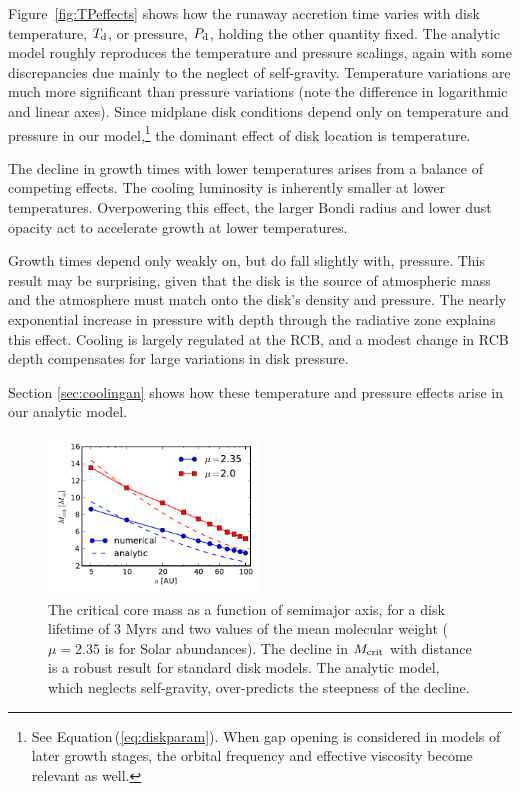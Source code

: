 \documentclass[apj, numberedappendix]{emulateapj}
\newcommand{\Eq}[1]{Equation\,(\ref{#1})}
\newcommand{\Fig}[1]{Figure~\ref{#1}}
\newcommand{\di}{_{\rm d}}
\newcommand{\MC}{M_{\rm crit}}
\begin{document}
\Fig{fig:TPeffects} shows how the runaway accretion time varies with disk temperature, $T\di$, or pressure, $P\di$, holding the other quantity fixed.   The analytic model roughly reproduces the temperature and pressure scalings, again with some discrepancies due mainly to the neglect of self-gravity.  Temperature variations are much more significant than pressure variations (note the difference in logarithmic and linear axes).  Since midplane disk conditions depend only on temperature and pressure in our model,\footnote{See \Eq{eq:diskparam}.  When gap opening is considered in models of later growth stages, the orbital frequency and effective viscosity become relevant as well.} the dominant effect of disk location is temperature.  

The decline in growth times with lower temperatures arises from a balance of competing effects.  The cooling luminosity is inherently smaller at lower temperatures.  Overpowering this effect, the larger Bondi radius and lower dust opacity act to accelerate growth at lower temperatures.

Growth times depend only weakly on, but do fall slightly with, pressure.   This result may be surprising, given that the disk is the source of atmospheric mass and the atmosphere must match onto the disk's density and pressure.  The nearly exponential increase in pressure with depth through the radiative zone explains this effect.  Cooling is largely regulated at the RCB, and a modest change in RCB depth compensates for large variations in disk pressure.

Section \ref{sec:coolingan} shows how these temperature and pressure effects arise in our analytic model.


\begin{figure}[htb]
\centering
\includegraphics[width=0.5\textwidth]{Mcrit_vs_a_3Myrs_new.pdf}
\caption{The critical core mass as a function of semimajor axis, for a disk lifetime of $3$ Myrs and two values of the mean molecular weight ($\mu = 2.35$ is for Solar abundances). The decline in $\MC$ with distance is a robust result for standard disk models.  The analytic model, which neglects self-gravity, over-predicts the steepness of the decline.}
\label{fig:Mcvsa}
\end{figure}
\end{document}
